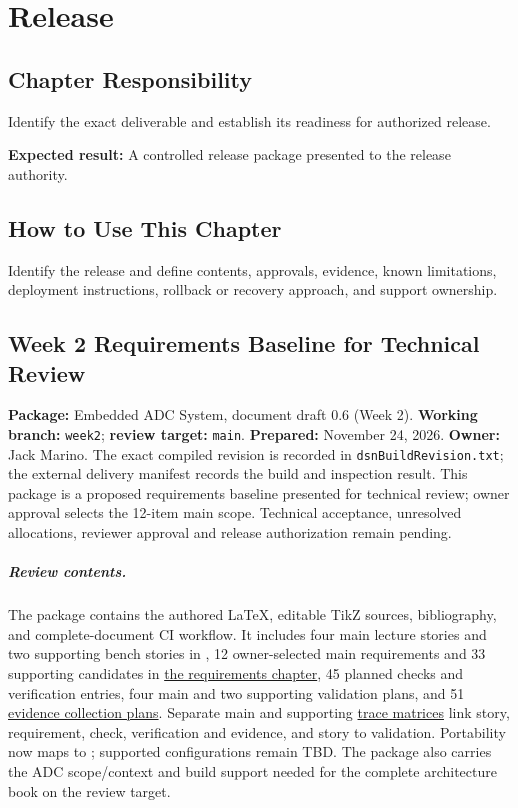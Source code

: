 \chapter{Release}
\section{Chapter Responsibility}
\label{Section:ReleaseResponsibility}
Identify the exact deliverable and establish its readiness for authorized release.

\noindent\textbf{Expected result:} A controlled release package presented to the release authority.

\section{How to Use This Chapter}
Identify the release and define contents, approvals, evidence, known limitations, deployment instructions, rollback or recovery approach, and support ownership.
\section{Week 2 Requirements Baseline for Technical Review}
\label{Section:WeekTwoReviewPackage}
\textbf{Package:} Embedded ADC System, document draft 0.6 (Week 2).
\textbf{Working branch:} \texttt{week2}; \textbf{review target:}
\texttt{main}. \textbf{Prepared:} November 24, 2026.
\textbf{Owner:} Jack Marino. The exact compiled revision is recorded in \texttt{dsnBuildRevision.txt};
the external delivery manifest records the build and inspection result. This package is a proposed requirements baseline presented for
technical review; owner approval selects the 12-item main scope. Technical acceptance, unresolved allocations, reviewer approval and release authorization remain pending.

\paragraph{Review contents.}
The package contains the authored LaTeX, editable TikZ sources, bibliography,
and complete-document CI workflow. It includes four main lecture stories and two supporting bench stories in
, 12 owner-selected main requirements and 33 supporting candidates in
\hyperref[Section:WeekTwoCandidates]{the requirements chapter}, 45 planned checks and verification entries,
four main and two supporting validation plans, and 51
\hyperref[Section:PlannedEvidence]{evidence collection plans}. Separate main and supporting
\hyperref[Table:TraceabilityMatrix]{trace matrices} link story, requirement, check, verification and evidence,
and story to validation. Portability now maps to ; supported configurations remain TBD.
The package also carries the ADC scope/context and build support needed for
the complete architecture book on the review target.

